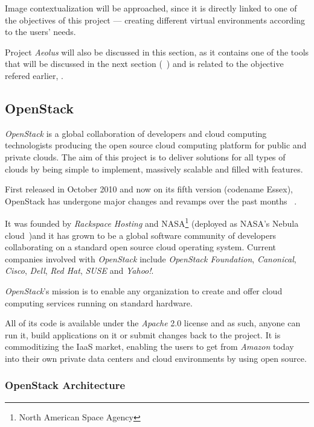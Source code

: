 Image contextualization will be approached, since it is directly linked to one of the objectives of this project --- creating different virtual environments according to the users' needs.

Project \textit{Aeolus} will also be discussed in this section, as it contains one of the tools that will be discussed in the next section (~) and is related to the objective refered earlier, .

\subsection{OpenStack}\label{subsec:openstack}

\textit{OpenStack} is a global collaboration of developers and cloud computing technologists producing the open source cloud computing platform for public and private clouds. The aim of this project is to deliver solutions for all types of clouds by being simple to implement, massively scalable and filled with features. 

First released in October 2010 and now on its fifth version (codename Essex), OpenStack has undergone major changes and revamps over the past months ~\cite{openstack}.

It was founded by \textit{Rackspace Hosting} and NASA\footnote{North American Space Agency} (deployed as NASA's Nebula cloud~\cite{nasa-nebula})and it has grown to be a global software community of developers collaborating on a standard open source cloud operating system. Current companies involved with \textit{OpenStack} include \textit{OpenStack Foundation}, \textit{Canonical}, \textit{Cisco}, \textit{Dell}, \textit{Red Hat}, \textit{SUSE} and \textit{Yahoo!}. \cite{stackgithub}

\textit{OpenStack}'s mission is to enable any organization to create and offer cloud computing services running on standard hardware.

All of its code is available under the \textit{Apache} 2.0 license and as such, anyone can run it, build applications on it or submit changes back to the project. It is commoditizing the IaaS market, enabling the users to get from \textit{Amazon} today into their own private data centers and cloud environments by using open source. \cite{stackgithub}

\subsubsection{OpenStack Architecture}\label{subsubsec:openstack_arch}
  
